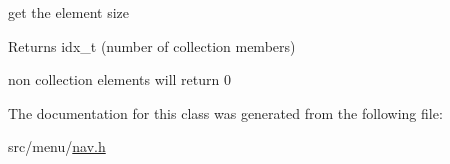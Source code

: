 get the element size 

\begin{DoxyReturn}{Returns}
idx\+\_\+t (number of collection members)
\end{DoxyReturn}
non collection elements will return 0 

The documentation for this class was generated from the following file\+:\begin{DoxyCompactItemize}
\item 
src/menu/\hyperlink{nav_8h}{nav.\+h}\end{DoxyCompactItemize}
